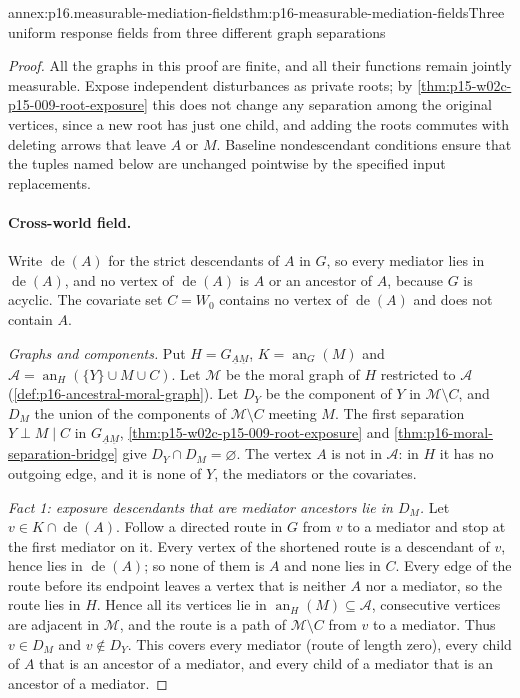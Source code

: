 \begin{annexitem}{annex:p16.measurable-mediation-fields}{thm:p16-measurable-mediation-fields}{Three uniform response fields from three different graph separations}
\begin{proof}
All the graphs in this proof are finite, and all their functions remain
jointly measurable. Expose independent disturbances as private roots;
by \cref{thm:p15-w02c-p15-009-root-exposure} this does not change any
separation among the original vertices, since a new root has just one
child, and adding the roots commutes with deleting arrows that leave
\(A\) or \(M\). Baseline nondescendant conditions ensure that the
tuples named below are unchanged pointwise by the specified input
replacements.

\paragraph{Cross-world field.}
Write \(\operatorname{de}(A)\) for the strict descendants of \(A\) in
\(G\), so every mediator lies in \(\operatorname{de}(A)\), and no vertex
of \(\operatorname{de}(A)\) is \(A\) or an ancestor of \(A\), because
\(G\) is acyclic. The covariate set \(C=W_0\) contains no vertex of
\(\operatorname{de}(A)\) and does not contain \(A\).

\emph{Graphs and components.} Put \(H=G_{\underline A\underline M}\),
\(K=\operatorname{an}_G(M)\) and
\(\mathcal A=\operatorname{an}_H(\{Y\}\cup M\cup C)\). Let \(\mathcal M\)
be the moral graph of \(H\) restricted to \(\mathcal A\)
(\cref{def:p16-ancestral-moral-graph}). Let \(D_Y\) be the component of
\(Y\) in \(\mathcal M\setminus C\), and \(D_M\) the union of the
components of \(\mathcal M\setminus C\) meeting \(M\). The first
separation \(Y\mathrel{\perp}M\mid C\) in \(G_{\underline A\underline M}\),
\cref{thm:p15-w02c-p15-009-root-exposure} and
\cref{thm:p16-moral-separation-bridge} give \(D_Y\cap D_M=\varnothing\).
The vertex \(A\) is not in \(\mathcal A\): in \(H\) it has no outgoing
edge, and it is none of \(Y\), the mediators or the covariates.

\emph{Fact 1: exposure descendants that are mediator ancestors lie in
\(D_M\).} Let \(v\in K\cap\operatorname{de}(A)\). Follow a directed
route in \(G\) from \(v\) to a mediator and stop at the first mediator
on it. Every vertex of the shortened route is a descendant of \(v\),
hence lies in \(\operatorname{de}(A)\); so none of them is \(A\) and
none lies in \(C\). Every edge of the route before its endpoint leaves a
vertex that is neither \(A\) nor a mediator, so the route lies in
\(H\). Hence all its vertices lie in \(\operatorname{an}_H(M)\subseteq
\mathcal A\), consecutive vertices are adjacent in \(\mathcal M\), and
the route is a path of \(\mathcal M\setminus C\) from \(v\) to a
mediator. Thus \(v\in D_M\) and \(v\notin D_Y\). This covers every
mediator (route of length zero), every child of \(A\) that is an
ancestor of a mediator, and every child of a mediator that is an
ancestor of a mediator.


\end{proof}
\end{annexitem}
